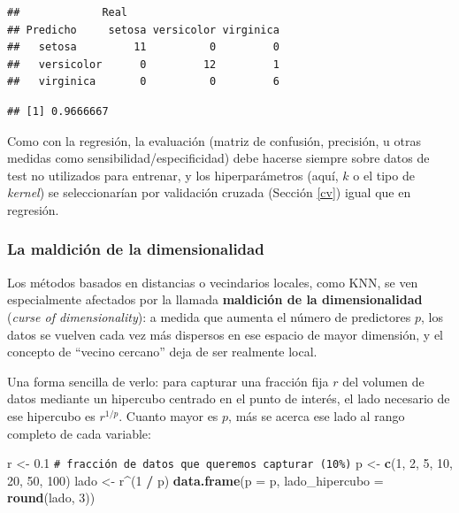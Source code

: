 \documentclass[
]{book}
\newenvironment{Shaded}{\begin{snugshade}}{\end{snugshade}}
\newcommand{\AttributeTok}[1]{\textcolor[rgb]{0.13,0.29,0.53}{#1}}
\newcommand{\CommentTok}[1]{\textcolor[rgb]{0.56,0.35,0.01}{\textit{#1}}}
\newcommand{\DecValTok}[1]{\textcolor[rgb]{0.00,0.00,0.81}{#1}}
\newcommand{\FloatTok}[1]{\textcolor[rgb]{0.00,0.00,0.81}{#1}}
\newcommand{\FunctionTok}[1]{\textcolor[rgb]{0.13,0.29,0.53}{\textbf{#1}}}
\newcommand{\NormalTok}[1]{#1}
\newcommand{\OtherTok}[1]{\textcolor[rgb]{0.56,0.35,0.01}{#1}}
\newcommand{\SpecialCharTok}[1]{\textcolor[rgb]{0.81,0.36,0.00}{\textbf{#1}}}
\theoremstyle{break}
\theoremstyle{nonumberplain}
\renewcommand{\CommentTok}[1]{\textcolor[rgb]{0.41,0.41,0.41}{\texttt{#1}}}
\begin{document}
\begin{verbatim}
##             Real
## Predicho     setosa versicolor virginica
##   setosa         11          0         0
##   versicolor      0         12         1
##   virginica       0          0         6
\end{verbatim}

\begin{Shaded}
\end{Shaded}

\begin{verbatim}
## [1] 0.9666667
\end{verbatim}

Como con la regresión, la evaluación (matriz de confusión, precisión, u otras medidas como sensibilidad/especificidad) debe hacerse siempre sobre datos de test no utilizados para entrenar, y los hiperparámetros (aquí, \(k\) o el tipo de \emph{kernel}) se seleccionarían por validación cruzada (Sección \ref{cv}) igual que en regresión.

\subsubsection{La maldición de la dimensionalidad}\label{maldicion}

Los métodos basados en distancias o vecindarios locales, como KNN, se ven especialmente afectados por la llamada \textbf{maldición de la dimensionalidad} (\emph{curse of dimensionality}): a medida que aumenta el número de predictores \(p\), los datos se vuelven cada vez más dispersos en ese espacio de mayor dimensión, y el concepto de ``vecino cercano'' deja de ser realmente local.

Una forma sencilla de verlo: para capturar una fracción fija \(r\) del volumen de datos mediante un hipercubo centrado en el punto de interés, el lado necesario de ese hipercubo es \(r^{1/p}\). Cuanto mayor es \(p\), más se acerca ese lado al rango completo de cada variable:

\begin{Shaded}
\begin{Highlighting}[]
\NormalTok{r }\OtherTok{\textless{}{-}} \FloatTok{0.1}  \CommentTok{\# fracción de datos que queremos capturar (10\%)}
\NormalTok{p }\OtherTok{\textless{}{-}} \FunctionTok{c}\NormalTok{(}\DecValTok{1}\NormalTok{, }\DecValTok{2}\NormalTok{, }\DecValTok{5}\NormalTok{, }\DecValTok{10}\NormalTok{, }\DecValTok{20}\NormalTok{, }\DecValTok{50}\NormalTok{, }\DecValTok{100}\NormalTok{)}
\NormalTok{lado }\OtherTok{\textless{}{-}}\NormalTok{ r}\SpecialCharTok{\^{}}\NormalTok{(}\DecValTok{1} \SpecialCharTok{/}\NormalTok{ p)}
\FunctionTok{data.frame}\NormalTok{(}\AttributeTok{p =}\NormalTok{ p, }\AttributeTok{lado\_hipercubo =} \FunctionTok{round}\NormalTok{(lado, }\DecValTok{3}\NormalTok{))}
\end{Highlighting}
\end{Shaded}
\end{document}

